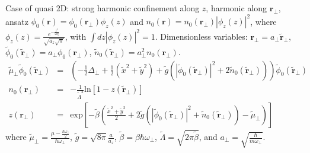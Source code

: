 \documentclass[12pt,a4paper]{report}
\newcommand{\abs}[1]{\left|#1\right|}
\renewcommand{\exp}[1]{\textrm{exp}\left[#1\right]}
\renewcommand{\ln}[1]{\textrm{ln}\left[#1\right]}
\begin{document}
Case of quasi 2D: strong harmonic confinement along $z$, harmonic along $\bm{r}_\perp$, ansatz $\phi_0(\bm{r})=\phi_0(\bm{r}_\perp)\phi_z(z)$ and $n_0(\bm{r})=n_0(\bm{r}_\perp)\abs{\phi_z(z)}^2$, where $\phi_z(z)=\frac{e^{-\frac{z^2}{2a_z^2}}}{\sqrt{a_z\sqrt{\pi}}}$, with $\int dz\abs{\phi_z(z)}^2=1$.
Dimensionless variables: $\bm{r}_\perp=a_\perp\tilde{\bm{r}}_\perp$, $\tilde{\phi}_0(\tilde{\bm{r}}_\perp)=a_\perp\phi_0(\bm{r}_\perp)$, $\tilde{n}_0(\tilde{\bm{r}}_\perp)=a_\perp^2n_0(\bm{r}_\perp)$.
\begin{eqnarray*}
\tilde{\mu}_\perp\tilde{\phi}_0(\tilde{\bm{r}}_\perp)
&=&\left(-\frac{1}{2}\Delta_\perp
+\frac{1}{2}(\tilde{x}^2+\tilde{y}^2)
+\tilde{g}
\left(\abs{\tilde{\phi}_0(\tilde{\bm{r}}_\perp)}^2+2\tilde{n}_0(\tilde{\bm{r}}_\perp)\right)\right)
\tilde{\phi}_0(\tilde{\bm{r}}_\perp)\\
n_0(\bm{r}_\perp)&=&-\frac{1}{\tilde{\Lambda}^2}\ln{1-z(\tilde{\bm{r}}_\perp)}\\
z(\bm{r}_\perp)&=&\exp{-\tilde{\beta}\left(\frac{\tilde{x}^2+\tilde{y}^2}{2}+2\tilde{g}\left(\abs{\tilde{\phi}_0(\tilde{\bm{r}}_\perp)}^2
+\tilde{n}_0(\tilde{\bm{r}}_\perp)\right)-\tilde{\mu}_\perp\right)}
\end{eqnarray*}
where $\tilde{\mu}_\perp=\frac{\mu-\frac{\hbar\omega_z}{2}}{\hbar\omega_\perp}$, $\tilde{g}=\sqrt{8\pi}\frac{a}{a_z}$, $\tilde{\beta}=\beta\hbar\omega_\perp$, $\tilde{\Lambda}=\sqrt{2\pi\tilde{\beta}}$, and $a_\perp=\sqrt{\frac{\hbar}{m\omega_\perp}}$.



\end{document}
